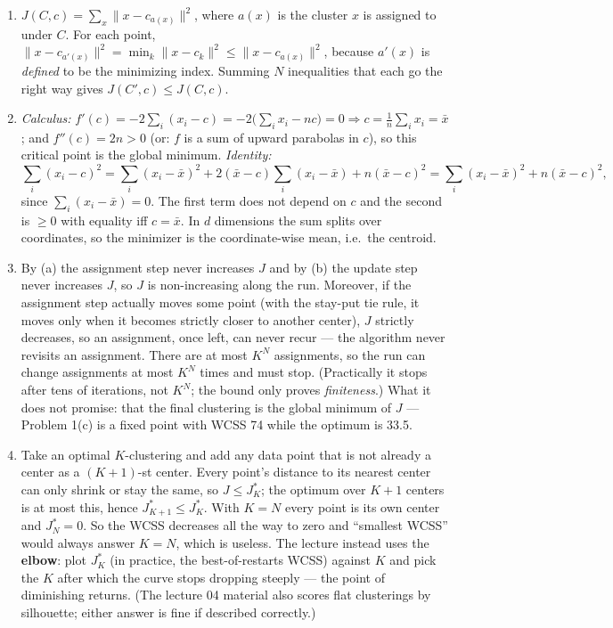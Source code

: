 \documentclass[
  11pt,
]{article}
\begin{document}
\begin{solutionbox}

\begin{enumerate}
\def\labelenumi{(\alph{enumi})}
\item
  \(J(C,c) = \sum_x \|x - c_{a(x)}\|^2\), where \(a(x)\) is the cluster
  \(x\) is assigned to under \(C\). For each point,
  \(\|x - c_{a'(x)}\|^2 = \min_k \|x-c_k\|^2 \le
  \|x-c_{a(x)}\|^2\), because \(a'(x)\) is \emph{defined} to be the
  minimizing index. Summing \(N\) inequalities that each go the right
  way gives \(J(C',c)\le J(C,c)\).
\item
  \emph{Calculus:}
  \(f'(c) = -2\sum_i (x_i - c) = -2\big(\sum_i x_i - nc\big) = 0
  \Rightarrow c = \frac1n\sum_i x_i = \bar x\); and \(f''(c) = 2n > 0\)
  (or: \(f\) is a sum of upward parabolas in \(c\)), so this critical
  point is the global minimum. \emph{Identity:}
  \[\sum_i (x_i-c)^2 = \sum_i (x_i-\bar x)^2 + 2(\bar x - c)\sum_i (x_i-\bar x) + n(\bar x-c)^2 = \sum_i (x_i-\bar x)^2 + n(\bar x - c)^2,\]
  since \(\sum_i(x_i-\bar x)=0\). The first term does not depend on
  \(c\) and the second is \(\ge 0\) with equality iff \(c=\bar x\). In
  \(d\) dimensions the sum splits over coordinates, so the minimizer is
  the coordinate-wise mean, i.e.~the centroid.
\item
  By (a) the assignment step never increases \(J\) and by (b) the update
  step never increases \(J\), so \(J\) is non-increasing along the run.
  Moreover, if the assignment step actually moves some point (with the
  stay-put tie rule, it moves only when it becomes strictly closer to
  another center), \(J\) strictly decreases, so an assignment, once
  left, can never recur --- the algorithm never revisits an assignment.
  There are at most \(K^N\) assignments, so the run can change
  assignments at most \(K^N\) times and must stop. (Practically it stops
  after tens of iterations, not \(K^N\); the bound only proves
  \emph{finiteness}.) What it does not promise: that the final
  clustering is the global minimum of \(J\) --- Problem 1(c) is a fixed
  point with WCSS 74 while the optimum is 33.5.
\item
  Take an optimal \(K\)-clustering and add any data point that is not
  already a center as a \((K{+}1)\)-st center. Every point's distance to
  its nearest center can only shrink or stay the same, so
  \(J \le J^*_K\); the optimum over \(K+1\) centers is at most this,
  hence \(J^*_{K+1} \le J^*_K\). With \(K = N\) every point is its own
  center and \(J^*_N = 0\). So the WCSS decreases all the way to zero
  and ``smallest WCSS'' would always answer \(K=N\), which is useless.
  The lecture instead uses the \textbf{elbow}: plot \(J^*_K\) (in
  practice, the best-of-restarts WCSS) against \(K\) and pick the \(K\)
  after which the curve stops dropping steeply --- the point of
  diminishing returns. (The lecture 04 material also scores flat
  clusterings by silhouette; either answer is fine if described
  correctly.)
\end{enumerate}

\end{solutionbox}
\end{document}
